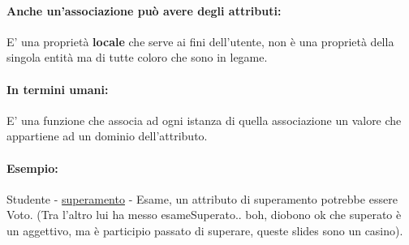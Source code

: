 \documentclass[12pt, a4paper, openany, twoside]{book}
\begin{document}
\paragraph{Anche un'associazione può avere degli attributi:} E' una proprietà
\textbf{locale} che serve ai fini dell'utente, non è una proprietà della singola
entità ma di tutte coloro che sono in legame.
\paragraph{In termini umani:} E' una funzione che associa ad ogni istanza di 
quella associazione un valore che appartiene ad un dominio dell'attributo.
\paragraph{Esempio:} Studente - \underline{superamento} - Esame, un attributo
di superamento potrebbe essere Voto. (Tra l'altro lui ha messo esameSuperato.. 
boh, diobono ok che superato è un aggettivo, ma è participio passato di superare,
queste slides sono un casino).
\end{document}
